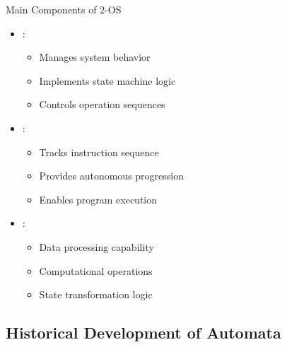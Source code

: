 \begin{frame}{Main Components of 2-OS}
\begin{itemize}
\item {}:
\begin{itemize}
\item Manages system behavior
\item Implements state machine logic
\item Controls operation sequences
\end{itemize}
\vspace{0.5cm}
\item {}:
\begin{itemize}
\item Tracks instruction sequence
\item Provides autonomous progression
\item Enables program execution
\end{itemize}
\vspace{0.5cm}
\item {}:
\begin{itemize}
\item Data processing capability
\item Computational operations
\item State transformation logic
\end{itemize}
\end{itemize}
\end{frame}

\subsection{Historical Development of Automata}


